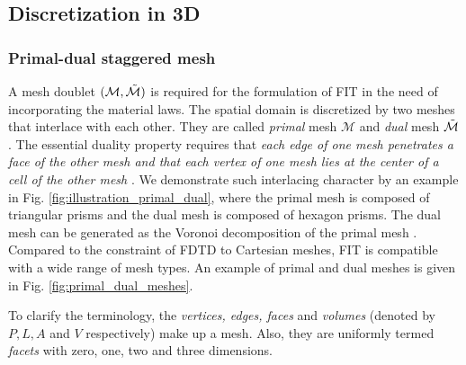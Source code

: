 \documentclass{article}
\begin{document}
\subsection{Discretization in 3D}
\subsubsection{Primal-dual staggered mesh}
A mesh doublet $(\mathcal{M}, \Tilde{\mathcal{M}})$ is required for the formulation of FIT in the need of incorporating the material laws. The spatial domain is discretized by two meshes that interlace with each other. They are called \emph{primal} mesh $\mathcal{M}$ and \emph{dual} mesh $\Tilde{\mathcal{M}}$. The essential duality property requires that \emph{each edge of one mesh penetrates a face of the other mesh and that each vertex of one mesh lies at the center of a cell of the other mesh} \citep{weiland_2003}. We demonstrate such interlacing character by an example in Fig. \ref{fig:illustration_primal_dual}, where the primal mesh is composed of triangular prisms and the dual mesh is composed of hexagon prisms. The dual mesh can be generated as the Voronoi decomposition of the primal mesh \citep{fuchs_2021}. Compared to the constraint of FDTD to Cartesian meshes, FIT is compatible with a wide range of mesh types. An example of primal and dual meshes is given in Fig. \ref{fig:primal_dual_meshes}.

To clarify the terminology, the \emph{vertices, edges, faces} and \emph{volumes} (denoted by $P,L,A$ and $V$ respectively) make up a mesh. Also, they are uniformly termed \emph{facets} with zero, one, two and three dimensions. 
\end{document}
